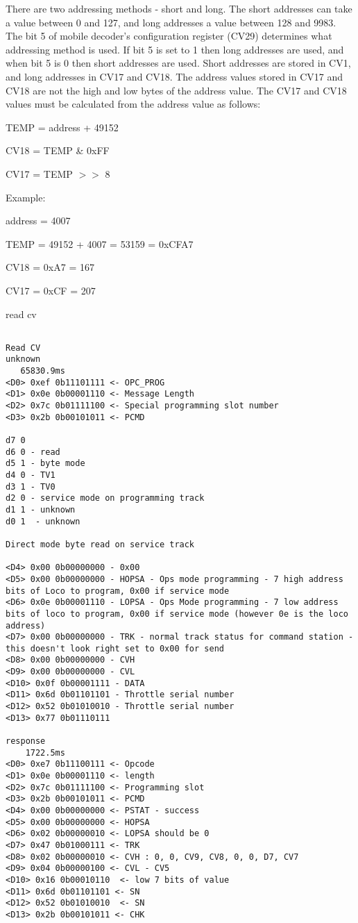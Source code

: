 There are two addressing methods - short and long. The short addresses can take a value between 0 and 127, and long addresses a value between 128 and 9983. The bit 5 of mobile decoder's configuration register (CV29) determines what addressing method is used. If bit 5 is set to 1 then long addresses are used, and when bit 5 is 0 then short addresses are used. Short addresses are stored in CV1, and long addresses in CV17 and CV18. The address values stored in CV17 and CV18 are not the high and low bytes of the address value. The CV17 and CV18 values must be calculated from the address value as follows:

TEMP = address + 49152

CV18 = TEMP \& 0xFF

CV17 = TEMP $>>$ 8

Example:

address = 4007

TEMP = 49152 + 4007 = 53159 = 0xCFA7

CV18 = 0xA7 = 167

CV17 = 0xCF = 207

read cv

\begin{verbatim}

Read CV
unknown
   65830.9ms 
<D0> 0xef 0b11101111 <- OPC_PROG
<D1> 0x0e 0b00001110 <- Message Length
<D2> 0x7c 0b01111100 <- Special programming slot number
<D3> 0x2b 0b00101011 <- PCMD

d7 0
d6 0 - read
d5 1 - byte mode
d4 0 - TV1
d3 1 - TV0 
d2 0 - service mode on programming track
d1 1 - unknown
d0 1  - unknown

Direct mode byte read on service track

<D4> 0x00 0b00000000 - 0x00
<D5> 0x00 0b00000000 - HOPSA - Ops mode programming - 7 high address bits of Loco to program, 0x00 if service mode
<D6> 0x0e 0b00001110 - LOPSA - Ops Mode programming - 7 low address bits of loco to program, 0x00 if service mode (however 0e is the loco address)
<D7> 0x00 0b00000000 - TRK - normal track status for command station - this doesn't look right set to 0x00 for send
<D8> 0x00 0b00000000 - CVH
<D9> 0x00 0b00000000 - CVL
<D10> 0x0f 0b00001111 - DATA
<D11> 0x6d 0b01101101 - Throttle serial number
<D12> 0x52 0b01010010 - Throttle serial number
<D13> 0x77 0b01110111 

response
    1722.5ms 
<D0> 0xe7 0b11100111 <- Opcode
<D1> 0x0e 0b00001110 <- length
<D2> 0x7c 0b01111100 <- Programming slot
<D3> 0x2b 0b00101011 <- PCMD
<D4> 0x00 0b00000000 <- PSTAT - success
<D5> 0x00 0b00000000 <- HOPSA
<D6> 0x02 0b00000010 <- LOPSA should be 0
<D7> 0x47 0b01000111 <- TRK
<D8> 0x02 0b00000010 <- CVH : 0, 0, CV9, CV8, 0, 0, D7, CV7
<D9> 0x04 0b00000100 <- CVL - CV5
<D10> 0x16 0b00010110  <- low 7 bits of value
<D11> 0x6d 0b01101101 <- SN
<D12> 0x52 0b01010010  <- SN
<D13> 0x2b 0b00101011 <- CHK
\end{verbatim}

